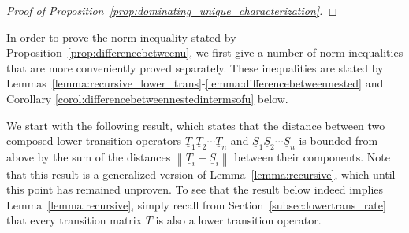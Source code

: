 \documentclass[10pt,a4paper]{paper}
\theoremstyle{definition}
\newcommand{\reals}{\mathbb{R}}
\newcommand{\realspos}{\reals_{>0}}
\newcommand{\states}{\mathcal{X}}
\newcommand{\lt}{\underline{T}}
\newcommand{\gambles}{\mathcal{L}}
\newcommand{\gamblesX}{\gambles(\states)}
\newcommand{\rateset}{\mathcal{Q}}
\newcommand{\lrate}{\underline{Q}}
\newcommand{\norm}[1]{\left\lVert #1 \right\rVert}
\begin{document}
\begin{proof}[Proof of Proposition~\ref{prop:dominating_unique_characterization}]
\end{proof}

In order to prove the norm inequality stated by Proposition~\ref{prop:differencebetweenu}, we first give a number of norm inequalities that are more conveniently proved separately. These inequalities are stated by Lemmas~\ref{lemma:recursive_lower_trans}-\ref{lemma:differencebetweennested} and Corollary \ref{corol:differencebetweennestedintermsofu} below.

We start with the following result, which states that the distance between two composed lower transition operators $\lt_1\lt_2\cdots\lt_n$ and $\underline{S}_1\underline{S}_2\cdots\underline{S}_n$ is bounded from above by the sum of the distances $\norm{\lt_i - \underline{S}_i}$ between their components. Note that this result is a generalized version of Lemma~\ref{lemma:recursive}, which until this point has remained unproven. To see that the result below indeed implies Lemma~\ref{lemma:recursive}, simply recall from Section~\ref{subsec:lowertrans_rate} that every transition matrix $T$ is also a lower transition operator.
\end{document}
